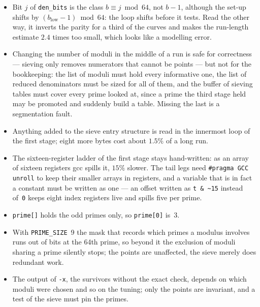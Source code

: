 \documentclass[12pt,a4paper,oneside]{amsart}
\begin{document}
\begin{itemize}
  \item Bit $j$ of \texttt{den\_bits} is the class $b \equiv j \bmod 64$, not
        $b - 1$, although the set-up shifts by $(b_{\text{low}} - 1) \bmod 64$:
        the loop shifts before it tests. Read the other way, it inverts the
        parity for a third of the curves and makes the run-length estimate
        $2.4$ times too small, which looks like a modelling error.
  \item Changing the number of moduli in the middle of a run is safe for
        correctness --- sieving only removes numerators that cannot be points
        --- but not for the bookkeeping: the list of moduli must hold every
        informative one, the list of reduced denominators must be sized for
        all of them, and the buffer of sieving tables must cover every prime
        looked at, since a prime the third stage held may be promoted and
        suddenly build a table. Missing the last is a segmentation fault.
  \item Anything added to the sieve entry structure is read in the innermost
        loop of the first stage; eight more bytes cost about $1.5\%$ of a
        long run.
  \item The sixteen-register ladder of the first stage stays hand-written:
        as an array of sixteen registers gcc spills it, $15\%$ slower. The
        tail legs need \texttt{\#pragma GCC unroll} to keep their smaller
        arrays in registers, and a variable that is in fact a constant must be
        written as one --- an offset written as \texttt{t \& \~{}15} instead
        of~\texttt{0} keeps eight index registers live and spills five per
        prime.
  \item \texttt{prime[]} holds the odd primes only, so \texttt{prime[0]} is~3.
  \item With \texttt{PRIME\_SIZE}~9 the mask that records which primes a
        modulus involves runs out of bits at the 64th prime, so beyond it the
        exclusion of moduli sharing a prime silently stops; the points are
        unaffected, the sieve merely does redundant work.
  \item The output of \verb+-x+, the survivors without the exact check,
        depends on which moduli were chosen and so on the tuning; only the
        points are invariant, and a test of the sieve must pin the primes.
\end{itemize}

\end{document}
